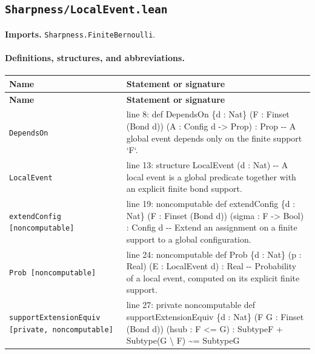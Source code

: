 \documentclass[10pt]{article}
\newcommand{\module}[1]{\texttt{#1}}
\begin{document}
\subsection*{\module{Sharpness/LocalEvent.lean}}
\textbf{Imports.} \module{Sharpness.FiniteBernoulli}.
\paragraph{Definitions, structures, and abbreviations.}
\begin{longtable}{>{\raggedright\arraybackslash}p{} >{\raggedright\arraybackslash}p{}}
\textbf{Name} & \textbf{Statement or signature} \\
\hline
\endfirsthead
\textbf{Name} & \textbf{Statement or signature} \\
\hline
\endhead
\texttt{DependsOn} & {\ttfamily\scriptsize line 8:\allowbreak{} def DependsOn \{d :\allowbreak{} Nat\} (\allowbreak{}F :\allowbreak{} Finset (\allowbreak{}Bond d)\allowbreak{})\allowbreak{} (\allowbreak{}A :\allowbreak{} Config d -\allowbreak{}> Prop)\allowbreak{} :\allowbreak{} Prop -\allowbreak{}-\allowbreak{} A global event depends only on the finite support `F`.\allowbreak{}} \\[0.45em]
\texttt{LocalEvent} & {\ttfamily\scriptsize line 13:\allowbreak{} structure LocalEvent (\allowbreak{}d :\allowbreak{} Nat)\allowbreak{} -\allowbreak{}-\allowbreak{} A local event is a global predicate together with an explicit finite bond support.\allowbreak{}} \\[0.45em]
\texttt{extendConfig [noncomputable]} & {\ttfamily\scriptsize line 19:\allowbreak{} noncomputable def extendConfig \{d :\allowbreak{} Nat\} (\allowbreak{}F :\allowbreak{} Finset (\allowbreak{}Bond d)\allowbreak{})\allowbreak{} (\allowbreak{}sigma :\allowbreak{} F -\allowbreak{}> Bool)\allowbreak{} :\allowbreak{} Config d -\allowbreak{}-\allowbreak{} Extend an assignment on a finite support to a global configuration.\allowbreak{}} \\[0.45em]
\texttt{Prob [noncomputable]} & {\ttfamily\scriptsize line 24:\allowbreak{} noncomputable def Prob \{d :\allowbreak{} Nat\} (\allowbreak{}p :\allowbreak{} Real)\allowbreak{} (\allowbreak{}E :\allowbreak{} LocalEvent d)\allowbreak{} :\allowbreak{} Real -\allowbreak{}-\allowbreak{} Probability of a local event,\allowbreak{} computed on its explicit finite support.\allowbreak{}} \\[0.45em]
\texttt{supportExtensionEquiv [private,\allowbreak{} noncomputable]} & {\ttfamily\scriptsize line 27:\allowbreak{} private noncomputable def supportExtensionEquiv \{d :\allowbreak{} Nat\} (\allowbreak{}F G :\allowbreak{} Finset (\allowbreak{}Bond d)\allowbreak{})\allowbreak{} (\allowbreak{}hsub :\allowbreak{} F <=\allowbreak{} G)\allowbreak{} :\allowbreak{} SubtypeF +\allowbreak{} Subtype(\allowbreak{}G \textbackslash{} F)\allowbreak{} \textasciitilde{}=\allowbreak{} SubtypeG} \\[0.45em]

\end{longtable}
\end{document}
